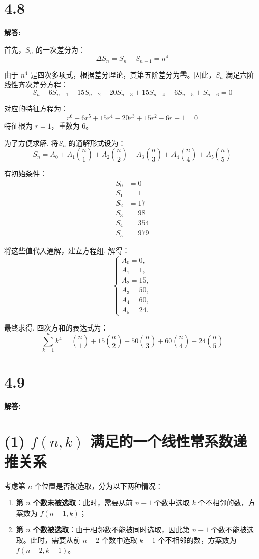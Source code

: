 \documentclass{article}
\begin{document}
\section*{4.8}
\textbf{解答:}


首先，$S_n$ 的一次差分为：
\[
\Delta S_n = S_n - S_{n-1} = n^4
\]

由于 $n^4$ 是四次多项式，根据差分理论，其第五阶差分为零。因此，$S_n$ 满足六阶线性齐次差分方程：
\[
S_n - 6S_{n-1} + 15S_{n-2} - 20S_{n-3} + 15S_{n-4} - 6S_{n-5} + S_{n-6} = 0
\]


对应的特征方程为：
\[
r^6 - 6r^5 + 15r^4 - 20r^3 + 15r^2 - 6r + 1 = 0
\]
特征根为 $r = 1$，重数为 6。

为了方便求解, 将$S_n$ 的通解形式设为：
\[
S_n = A_0 +  A_1\binom{n}{1} +  A_2 \binom{n}{2} +  A_3 \binom{n}{3} +  A_4 \binom{n}{4} +  A_5 \binom{n}{5}
\]


有初始条件：
\begin{align*}
S_0 &= 0 \\
S_1 &= 1 \\
S_2 &= 17 \\
S_3 &= 98 \\
S_4 &= 354 \\
S_5 &= 979
\end{align*}

将这些值代入通解，建立方程组, 解得：
\[
\begin{cases}
A_0 = 0, \\
A_1 = 1, \\
A_2 = 15, \\
A_3 = 50, \\
A_4 = 60, \\
A_5 = 24.
\end{cases}
\]

最终求得, 四次方和的表达式为：
\[
\boxed{\sum_{k=1}^n k^4 = \binom{n}{1} + 15 \binom{n}{2} + 50 \binom{n}{3} + 60 \binom{n}{4} + 24 \binom{n}{5}}
\]
\section*{4.9}
\textbf{解答:}
\section*{(1) $f(n, k)$ 满足的一个线性常系数递推关系}
考虑第 $n$ 个位置是否被选取，分为以下两种情况：

\begin{enumerate}
    \item \textbf{第 $n$ 个数未被选取}：此时，需要从前 $n-1$ 个数中选取 $k$ 个不相邻的数，方案数为 $f(n-1, k)$；
    \item \textbf{第 $n$ 个数被选取}：由于相邻数不能被同时选取，因此第 $n-1$ 个数不能被选取。此时，需要从前 $n-2$ 个数中选取 $k-1$ 个不相邻的数，方案数为 $f(n-2, k-1)$。
\end{enumerate}
\end{document}
